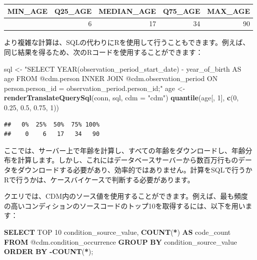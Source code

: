 \documentclass[
  11pt]{book}
\newenvironment{Shaded}{\begin{snugshade}}{\end{snugshade}}
\newcommand{\AttributeTok}[1]{\textcolor[rgb]{0.13,0.29,0.53}{#1}}
\newcommand{\DecValTok}[1]{\textcolor[rgb]{0.00,0.00,0.81}{#1}}
\newcommand{\FloatTok}[1]{\textcolor[rgb]{0.00,0.00,0.81}{#1}}
\newcommand{\FunctionTok}[1]{\textcolor[rgb]{0.13,0.29,0.53}{\textbf{#1}}}
\newcommand{\KeywordTok}[1]{\textcolor[rgb]{0.13,0.29,0.53}{\textbf{#1}}}
\newcommand{\NormalTok}[1]{#1}
\newcommand{\OperatorTok}[1]{\textcolor[rgb]{0.81,0.36,0.00}{\textbf{#1}}}
\newcommand{\OtherTok}[1]{\textcolor[rgb]{0.56,0.35,0.01}{#1}}
\newcommand{\StringTok}[1]{\textcolor[rgb]{0.31,0.60,0.02}{#1}}
\theoremstyle{definition}
\theoremstyle{definition}
\theoremstyle{definition}
\theoremstyle{definition}
\theoremstyle{remark}
\begin{document}
\begin{longtable}[]{@{}rrrrr@{}}
\toprule\noalign{}
MIN\_AGE & Q25\_AGE & MEDIAN\_AGE & Q75\_AGE & MAX\_AGE \\
\midrule\noalign{}
\endhead
\bottomrule\noalign{}
\endlastfoot
0 & 6 & 17 & 34 & 90 \\
\end{longtable}

より複雑な計算は、SQLの代わりにRを使用して行うこともできます。例えば、同じ結果を得るため、次のRコードを使用することができます：

\begin{Shaded}
\begin{Highlighting}[]
\NormalTok{sql }\OtherTok{\textless{}{-}} \StringTok{"SELECT YEAR(observation\_period\_start\_date) {-}}
\StringTok{               year\_of\_birth AS age}
\StringTok{FROM @cdm.person}
\StringTok{INNER JOIN @cdm.observation\_period}
\StringTok{  ON person.person\_id = observation\_period.person\_id;"}
\NormalTok{age }\OtherTok{\textless{}{-}} \FunctionTok{renderTranslateQuerySql}\NormalTok{(conn, sql, }\AttributeTok{cdm =} \StringTok{"cdm"}\NormalTok{)}
\FunctionTok{quantile}\NormalTok{(age[, }\DecValTok{1}\NormalTok{], }\FunctionTok{c}\NormalTok{(}\DecValTok{0}\NormalTok{, }\FloatTok{0.25}\NormalTok{, }\FloatTok{0.5}\NormalTok{, }\FloatTok{0.75}\NormalTok{, }\DecValTok{1}\NormalTok{))}
\end{Highlighting}
\end{Shaded}

\begin{verbatim}
##   0%  25%  50%  75% 100%
##    0    6   17   34   90
\end{verbatim}

ここでは、サーバー上で年齢を計算し、すべての年齢をダウンロードし、年齢分布を計算します。しかし、これにはデータベースサーバーから数百万行ものデータをダウンロードする必要があり、効率的ではありません。計算をSQLで行うかRで行うかは、ケースバイケースで判断する必要があります。

クエリでは、CDM内のソース値を使用することができます。例えば、最も頻度の高いコンディションのソースコードのトップ10を取得するには、以下を用います：

\begin{Shaded}
\begin{Highlighting}[]
\KeywordTok{SELECT}\NormalTok{ TOP }\DecValTok{10}\NormalTok{ condition\_source\_value,}
  \FunctionTok{COUNT}\NormalTok{(}\OperatorTok{*}\NormalTok{) }\KeywordTok{AS}\NormalTok{ code\_count}
\KeywordTok{FROM}\NormalTok{ @cdm.condition\_occurrence}
\KeywordTok{GROUP} \KeywordTok{BY}\NormalTok{ condition\_source\_value}
\KeywordTok{ORDER} \KeywordTok{BY} \OperatorTok{{-}}\FunctionTok{COUNT}\NormalTok{(}\OperatorTok{*}\NormalTok{);}
\end{Highlighting}
\end{Shaded}
\end{document}
